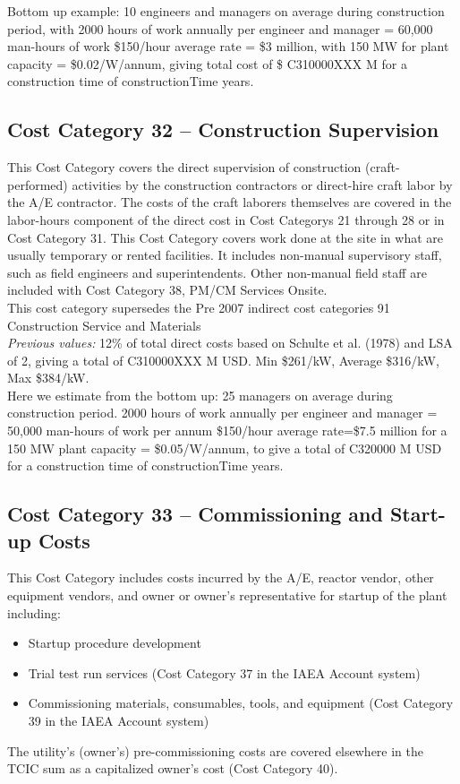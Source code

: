 Bottom up example: 10 engineers and managers on average during construction period, with 2000 hours of work annually per engineer and manager = 60,000 man-hours of work \$150/hour average rate = \$3 million, with 150 MW for plant capacity = \$0.02/W/annum, giving total cost of \$ C310000XXX M for a construction time of constructionTime years.


\subsection*{Cost Category 32 – Construction Supervision}
This Cost Category covers the direct supervision of construction (craft-performed) activities by the construction contractors or direct-hire craft labor by the A/E contractor. The costs of the craft laborers themselves are covered in the labor-hours component of the direct cost in Cost Categorys 21 through 28 or in Cost Category 31. This Cost Category covers work done at the site in what are usually temporary or rented facilities. It includes non-manual supervisory staff, such as field engineers and superintendents. Other non-manual field staff are included with Cost Category 38, PM/CM Services Onsite.\\

This cost category supersedes the Pre 2007 indirect cost categories 91 Construction Service and Materials  \\

\emph{Previous values: } 
12\% of total direct costs based on Schulte et al. (1978) and LSA of 2, giving a total of C310000XXX M USD. Min \$261/kW, Average \$316/kW, Max \$384/kW. \\

Here we estimate from the bottom up: 25 managers on average during construction period. 2000 hours of work annually per engineer and manager = 50,000 man-hours of work per annum \$150/hour average rate=\$7.5 million for a 150 MW plant capacity = \$0.05/W/annum, to give a total of C320000 M USD for a construction time of constructionTime years.

\subsection*{Cost Category 33 – Commissioning and Start-up Costs}
This Cost Category includes costs incurred by the A/E, reactor vendor, other equipment vendors, and owner or owner’s representative for startup of the plant including:
\begin{itemize}
    \item Startup procedure development
    \item Trial test run services (Cost Category 37 in the IAEA Account system)
    \item Commissioning materials, consumables, tools, and equipment (Cost Category 39 in the IAEA Account system)
\end{itemize}
The utility’s (owner’s) pre-commissioning costs are covered elsewhere in the TCIC sum as a capitalized owner’s cost (Cost Category 40).

